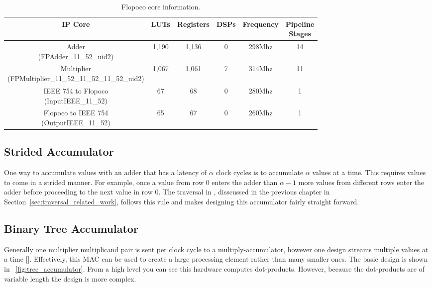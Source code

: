 \begin{table}
    \caption{Flopoco core information.}
    \label{tbl:flopoco}
    \begin{tabular}{|c|ccccc|}
        \hline
        IP Core & LUTs & Registers & DSPs & Frequency & \shortstack{Pipeline\\Stages} \\
        \hline
        \shortstack{Adder\\(FPAdder\_11\_52\_uid2)} & 1,190 & 1,136 & 0 & 298Mhz & 14 \\
        \hline
        \shortstack{Multiplier\\(FPMultiplier\_11\_52\_11\_52\_11\_52\_uid2)} & 1,067 & 1,061 & 7 & 314Mhz & 11 \\
        \hline
        \shortstack{IEEE 754 to Flopoco\\(InputIEEE\_11\_52)} & 67 & 68 & 0 & 280Mhz & 1 \\
        \hline
        \shortstack{Flopoco to IEEE 754\\(OutputIEEE\_11\_52)} & 65 & 67 & 0 & 260Mhz & 1 \\
        \hline
    \end{tabular}
\end{table}

\subsection{Strided Accumulator}
One way to accumulate values with an adder that has a latency of $\alpha$ clock cycles is to accumulate $\alpha$ values at a time. This requires values to come in a strided manner. For example, once a value from row 0 enters the adder than $\alpha - 1$ more values from different rows enter the adder before proceeding to the next value in row 0. The traversal in \cite{prelim:fowers}, disscussed in the previous chapter in Section~\ref{sec:traversal_related_work}, follows this rule and makes designing this accumulator fairly straight forward.

\subsection{Binary Tree Accumulator}
Generally one multiplier multiplicand pair is sent per clock cycle to a multiply-accumulator, however one design streams multiple values at a time [\cite{prelim:sun2}]. Effectively, this MAC can be used to create a large processing element rather than many smaller ones. The basic design is shown in \figurename~\ref{fig:tree_accumulator}. From a high level you can see this hardware computes dot-products. However, because the dot-products are of variable length the design is more complex.

